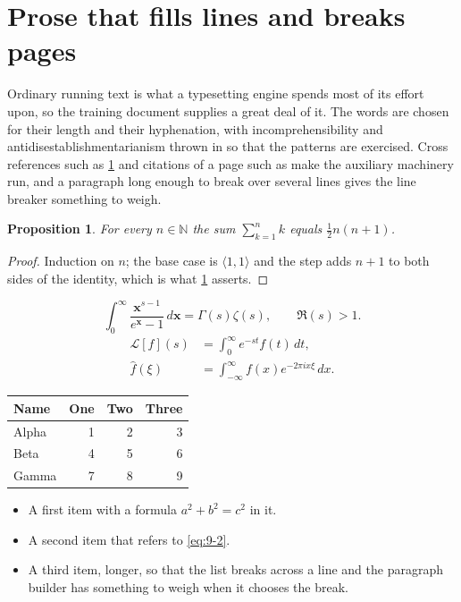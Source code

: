\documentclass[11pt,a4paper]{report}
\theoremstyle{plain}
\newtheorem{proposition}{Proposition}[chapter]
\newcommand{\vecn}[1]{\mathbf{#1}}
\newcommand{\pairs}[2]{\langle #1,#2\rangle}
\begin{document}
\section{Prose that fills lines and breaks pages}
\label{sec:prose9-2}
Ordinary running text is what a typesetting engine spends most of its effort
upon, so the training document supplies a great deal of it. The words are
chosen for their length and their hyphenation, with incomprehensibility and
antidisestablishmentarianism thrown in so that the patterns are exercised.
Cross references such as \cref{sec:prose9-2} and citations of a page such
as \pageref{sec:prose9-2} make the auxiliary machinery run, and a
paragraph long enough to break over several lines gives the line breaker
something to weigh.
\begin{proposition}\label{prop:9-2}
For every $n\in\mathbb{N}$ the sum $\sum_{k=1}^{n}k$ equals
$\tfrac{1}{2}n(n+1)$.
\end{proposition}
\begin{proof}
Induction on $n$; the base case is $\pairs{1}{1}$ and the step adds $n+1$ to
both sides of the identity, which is what \cref{prop:9-2} asserts.
\end{proof}
\begin{equation}\label{eq:9-2}
  \int_{0}^{\infty}\frac{\vecn{x}^{s-1}}{e^{\vecn{x}}-1}\,d\vecn{x}
    = \Gamma(s)\zeta(s),\qquad \Re(s)>1 .
\end{equation}
\begin{align}
  \mathcal{L}[f](s) &= \int_{0}^{\infty} e^{-st} f(t)\,dt, \\
  \widehat{f}(\xi)  &= \int_{-\infty}^{\infty} f(x) e^{-2\pi i x\xi}\,dx .
\end{align}
\par\noindent\begin{center}
\begin{tabular}{lrrr}
\hline
Name & One & Two & Three \\
\hline
Alpha & 1 & 2 & 3 \\
Beta & 4 & 5 & 6 \\
Gamma & 7 & 8 & 9 \\
\hline
\end{tabular}
\end{center}
\begin{itemize}
  \item A first item with a formula $a^2+b^2=c^2$ in it.
  \item A second item that refers to \eqref{eq:9-2}.
  \item A third item, longer, so that the list breaks across a line and the
    paragraph builder has something to weigh when it chooses the break.
\end{itemize}
\end{document}
